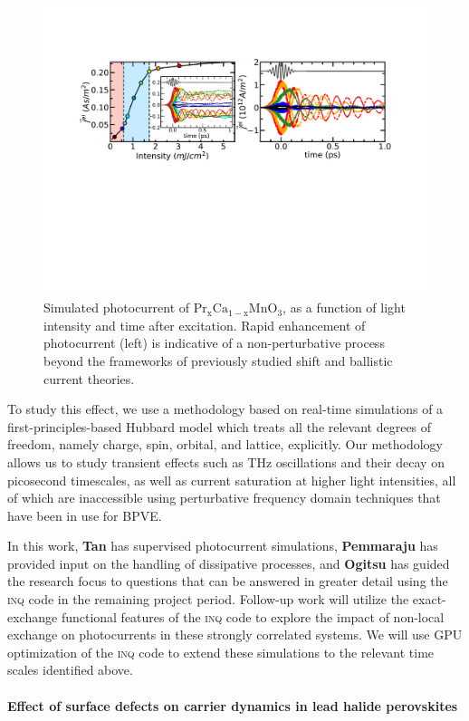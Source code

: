 \begin{figure}[ht]
	\centering\includegraphics[width=0.8\linewidth]{figures/photocurrent_old}
	\caption{%
		Simulated photocurrent of \(\mathrm{Pr_xCa_{1-x}MnO_3}\), as a function of light intensity and time after excitation. 
		Rapid enhancement of photocurrent (left) is indicative of a non-perturbative process beyond the frameworks of previously studied shift and ballistic current theories.
	}
	\label{fig:PCMO}
\end{figure}

To study this effect, we use a methodology based on real-time simulations of a first-principles-based Hubbard model which treats all the relevant degrees of freedom, namely charge, spin, orbital, and lattice, explicitly. 
Our methodology allows us to study transient effects such as THz oscillations and their decay on picosecond timescales, as well as current saturation at higher light intensities, all of which are inaccessible using perturbative frequency domain techniques that have been in use for BPVE. 

In this work, {\bf Tan} has supervised photocurrent simulations, {\bf Pemmaraju} has provided input on the handling of dissipative processes, and {\bf Ogitsu} has guided the research focus to questions that can be answered in greater detail using the \textsc{inq} code in the remaining project period. 
Follow-up work will utilize the exact-exchange functional features of the \textsc{inq} code to explore the impact of non-local exchange on photocurrents in these strongly correlated systems. 
We will use GPU optimization of the \textsc{inq} code to extend these simulations to the relevant time scales identified above.  

\paragraph{Effect of surface defects on carrier dynamics in lead halide perovskites}

